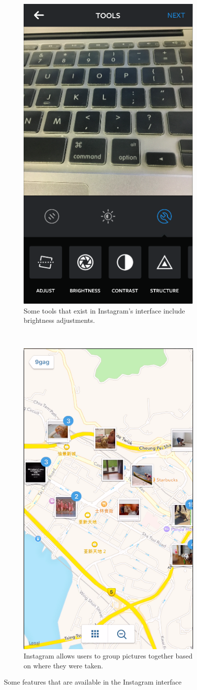 \documentclass[11pt]{article}
\begin{document}
\begin{figure}[ht]
\centering
\begin{subfigure}[b]{.5\textwidth}
   \centering
    \includegraphics[height=\textwidth]{images/instagram_tools.png}
    \caption{Some tools that exist in Instagram's interface include brightness adjustments.}
    \label{tools}
\end{subfigure}%
~~~~~~~
\begin{subfigure}[b]{.5\textwidth}
    \centering
    \includegraphics[height=\textwidth]{images/maps_with_pictures.png}
    \caption{Instagram allows users to group pictures together based on where they were taken.}
    \label{instagram_pictures}
\end{subfigure}
\caption{Some features that are available in the Instagram interface}
\end{figure}
\end{document}
